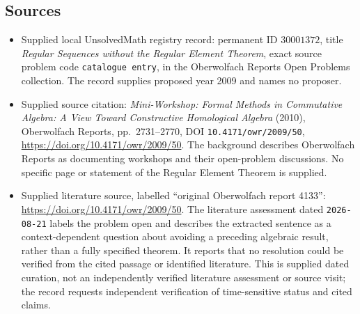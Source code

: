 \documentclass[11pt]{article}
\begin{document}
\subsection{Sources}
\begin{itemize}
\item Supplied local UnsolvedMath registry record: permanent ID \(30001372\), title \emph{Regular Sequences without the Regular Element Theorem}, exact source problem code \texttt{catalogue entry}, in the Oberwolfach Reports Open Problems collection. The record supplies proposed year 2009 and names no proposer.
\item Supplied source citation: \emph{Mini-Workshop: Formal Methods in Commutative Algebra: A View Toward Constructive Homological Algebra} (2010), Oberwolfach Reports, pp.\ 2731--2770, DOI \texttt{10.4171/owr/2009/50}, \url{https://doi.org/10.4171/owr/2009/50}. The background describes Oberwolfach Reports as documenting workshops and their open-problem discussions. No specific page or statement of the Regular Element Theorem is supplied.
\item Supplied literature source, labelled ``original Oberwolfach report 4133'': \url{https://doi.org/10.4171/owr/2009/50}. The literature assessment dated \texttt{2026-08-21} labels the problem open and describes the extracted sentence as a context-dependent question about avoiding a preceding algebraic result, rather than a fully specified theorem. It reports that no resolution could be verified from the cited passage or identified literature. This is supplied dated curation, not an independently verified literature assessment or source visit; the record requests independent verification of time-sensitive status and cited claims.
\end{itemize}
\end{document}
